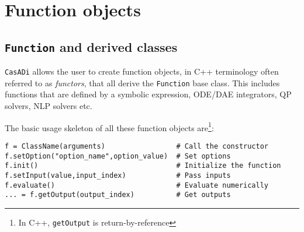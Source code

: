 \documentclass[a4paper,12pt]{book}
\newcommand{\CasADi}{\texttt{CasADi}\xspace}
\newcounter{pytexcount}
\newcounter{pytexsubcount}
\renewenvironment{pytex}
{\addtocounter{pytexsubcount}{1}%
\begin{rawhtml}
<div style="color: black; background-color: \#b9c8db;  border-style: dotted; border-width: 1px; padding:2px;padding-left:1em" >
<pre>
\end{rawhtml}
}%
{\begin{rawhtml}
</pre>
</div>
<div style="color: black; background-color: \#fffff;  border-style: solid; border-width: 1px; padding:2px;padding-left:1em;margin-left:1em;" >\end{rawhtml}%
\verbatiminputeval{pytex_\alph{pytexcount}_\arabic{pytexsubcount}.log}%
\begin{rawhtml}
</div>
\end{rawhtml}
}
\begin{document}







\chapter{Function objects} \label{ch:function}

\section{\texttt{Function} and derived classes} \label{sec:function}
\CasADi allows the user to create function objects, in C++ terminology often referred to as \emph{functors}, that all derive the \texttt{Function} base class. This includes functions that are defined by a symbolic expression, ODE/DAE integrators, QP solvers, NLP solvers etc.

The basic usage skeleton of all these function objects are\footnote{In C++, \texttt{getOutput} is return-by-reference}:
\begin{verbatim}
f = ClassName(arguments)                 # Call the constructor
f.setOption("option_name",option_value)  # Set options
f.init()                                 # Initialize the function
f.setInput(value,input_index)            # Pass inputs
f.evaluate()                             # Evaluate numerically
... = f.getOutput(output_index)          # Get outputs
\end{verbatim}
\end{document}
